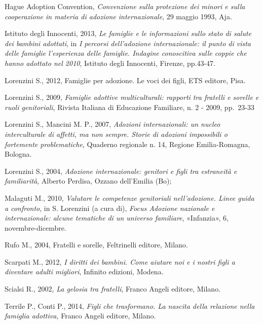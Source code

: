 \documentclass[12pt,oneside,svgnames]{memoir}
\begin{document}
Hague Adoption Convention, \emph{Convenzione sulla protezione dei minori
e sulla cooperazione in materia di adozione internazionale}, 29 maggio
1993, Aja.

Istituto degli Innocenti, 2013, \emph{Le famiglie e le informazioni
sullo stato di salute dei bambini adottati}, in \emph{I percorsi
dell'adozione internazionale: il punto di vista delle famiglie
l'esperienza delle famiglie. Indagine conoscitiva sulle coppie che hanno
adottato nel 2010}, Istituto degli Innocenti, Firenze, pp.43-47.

Lorenzini S., 2012, Famiglie per adozione. Le voci dei figli, ETS
editore, Pisa.

Lorenzini S., 2009, \emph{Famiglie adottive multiculturali: rapporti tra
fratelli e sorelle e ruoli genitoriali}, Rivista Italiana di Educazione
Familiare, n. 2 - 2009, pp.~23-33

Lorenzini S., Mancini M. P., 2007, \emph{Adozioni internazionali: un
nucleo interculturale di affetti, ma non sempre. Storie di adozioni
impossibili o fortemente problematiche}, Quaderno regionale n. 14,
Regione Emilia-Romagna, Bologna.

Lorenzini S., 2004, \emph{Adozione internazionale: genitori e figli tra
estraneità e familiarità}, Alberto Perdisa, Ozzano dell'Emilia (Bo);

Malaguti M., 2010, \emph{Valutare le competenze genitoriali
nell'adozione. Linee guida a confronto}, in S. Lorenzini (a cura di),
\emph{Focus Adozione nazionale e internazionale: alcune tematiche di un
universo familiare}, «Infanzia», 6, novembre-dicembre.

Rufo M., 2004, Fratelli e sorelle, Feltrinelli editore, Milano.

Scarpati M., 2012, \emph{I diritti dei bambini. Come aiutare noi e i
nostri figli a diventare adulti migliori}, Infinito edizioni, Modena.

Scialsi R., 2002, \emph{La gelosia tra fratelli}, Franco Angeli editore,
Milano.

Terrile P., Conti P., 2014, \emph{Figli che trasformano. La nascita
della relazione nella famiglia adottiva, }Franco Angeli editore, Milano.
\end{document}
